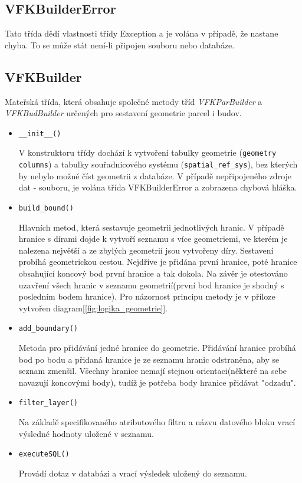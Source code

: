 \subsection{VFKBuilderError}
Tato třída dědí vlastnosti třídy Exception a je volána v případě, že nastane chyba. To se může stát není-li připojen  souboru nebo databáze.
\subsection{VFKBuilder}
\label{subsec:sestaveni_geometrie}
Mateřská třída, která obsahuje společné metody tříd \textit{VFKParBuilder} a \textit{VFKBudBuilder} určených pro sestavení geometrie parcel i budov.
\begin{itemize}[leftmargin=50pt]
\item \verb|__init__()|
		
V konstruktoru třídy dochází k vytvoření tabulky geometrie (\verb|geometry columns|) a tabulky souřadnicového systému (\verb|spatial_ref_sys|), bez kterých by nebylo možné číst geometrii z databáze. V případě nepřipojeného zdroje dat -  souboru, je volána třída VFKBuilderError a zobrazena chybová hláška.
\item \verb|build_bound()|

Hlavních metod, která sestavuje geometrii jednotlivých hranic. V případě hranice s dírami dojde k vytvoří seznamu s více geometriemi, ve kterém je nalezena největší a ze zbylých geometrií jsou vytvořeny díry. Sestavení probíhá geometrickou cestou. Nejdříve je přidána první hranice, poté hranice obsahující koncový bod první hranice a tak dokola. Na závěr je otestováno uzavření všech hranic v seznamu geometrií(první bod hranice je shodný s posledním bodem hranice). Pro názornost principu metody je v příloze vytvořen diagram[\ref{fig:logika_geometrie}].
\item \verb|add_boundary()|

Metoda pro přidávání jedné hranice do geometrie. Přidávání hranice probíhá bod po bodu a přidaná hranice je ze seznamu hranic odstraněna, aby se seznam zmenšil. Všechny hranice nemají stejnou orientaci(některé na sebe navazují koncovými body), tudíž je potřeba body hranice přidávat "odzadu".
\item \verb|filter_layer()|

Na základě specifikovaného atributového filtru a názvu datového bloku vrací výsledné hodnoty uložené v seznamu.
\item \verb|executeSQL()|

Provádí  dotaz v databázi a vrací výsledek uložený do seznamu.

\end{itemize}
